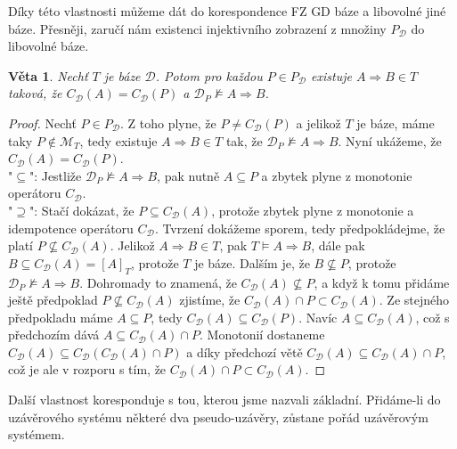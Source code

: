 \documentclass{article}
\newtheorem{theorem}{Věta}
\theoremstyle {definition}
\begin{document}
Díky této vlastnosti můžeme dát do korespondence FZ GD báze a
libovolné jiné báze. Přesněji, zaručí nám existenci injektivního
zobrazení z množiny $P_{\mathcal{D}}$ do libovolné báze.

\begin{theorem}
  Nechť $T$ je báze $\mathcal{D}$. Potom pro každou $P \in
  P_{\mathcal{D}}$ existuje $A \Rightarrow B \in T$ taková, že
  $C_{\mathcal{D}}(A) = C_{\mathcal{D}}(P)$ a $\mathcal{D}_P
  \not\models A \Rightarrow B$.
\end{theorem}
\begin{proof}
  Nechť $P \in P_{\mathcal{D}}$. Z toho plyne, že $P \neq
  C_{\mathcal{D}}(P)$ a jelikož $T$ je báze, máme taky $P \not\in
  \mathcal{M}_T$, tedy existuje $A \Rightarrow B \in T$ tak, že
  $\mathcal{D}_P \not\models A \Rightarrow B$. Nyní ukážeme, že
  $C_{\mathcal{D}}(A) = C_{\mathcal{D}}(P)$. \\
  
  "$\subseteq$": Jestliže $\mathcal{D}_P \not\models A \Rightarrow B$,
  pak nutně $A\subseteq P$ a zbytek plyne z monotonie operátoru
  $C_{\mathcal{D}}$. \\

  "$\supseteq$": Stačí dokázat, že $P\subseteq C_{\mathcal D}(A)$,
  protože zbytek plyne z monotonie a idempotence operátoru
  $C_{\mathcal D}$. Tvrzení dokážeme sporem, tedy předpokládejme, že
  platí $P\not\subseteq C_{\mathcal D}(A)$. Jelikož $A\Rightarrow B\in
  T$, pak $T\models A\Rightarrow B$, dále pak $B\subseteq
  C_{\mathcal{D}}(A) = [A]_T$, protože $T$ je báze. Dalším je, že
  $B\not\subseteq P$, protože $\mathcal{D}_P \not\models A \Rightarrow
  B$. Dohromady to znamená, že $C_{\mathcal{D}}(A) \not\subseteq P$, a
  když k tomu přidáme ještě předpoklad $P\not\subseteq C_{\mathcal
    D}(A)$ zjistíme, že $C_{\mathcal D}(A) \cap P \subset C_{\mathcal
    D}(A)$. Ze stejného předpokladu máme $A\subseteq P$, tedy
  $C_{\mathcal D}(A)\subseteq C_{\mathcal D}(P)$. Navíc $A \subseteq
  C_{\mathcal D}(A)$, což s předchozím dává $A\subseteq C_{\mathcal
    D}(A) \cap P$. Monotonií dostaneme $C_{\mathcal D}(A)\subseteq
  C_{\mathcal D}(C_{\mathcal D}(A) \cap P)$ a díky předchozí větě
  $C_{\mathcal D}(A)\subseteq C_{\mathcal D}(A) \cap P$, což je ale v
  rozporu s tím, že $C_{\mathcal D}(A) \cap P \subset C_{\mathcal
    D}(A)$.
\end{proof}

Další vlastnost koresponduje s tou, kterou jsme nazvali
základní. Přidáme-li do uzávěrového systému některé dva
pseudo-uzávěry, zůstane pořád uzávěrovým systémem.
\end{document}
